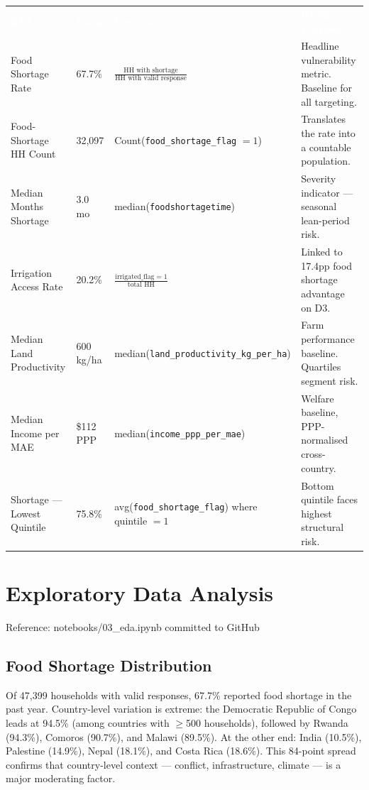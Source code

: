 \documentclass[11pt,a4paper]{article}
\newcommand{\tH}[1]{\cellcolor{rhoRed}\textcolor{white}{\textbf{#1}}}
\newcommand{\nb}[1]{\vspace{2pt}\begin{refbox}Reference: #1\end{refbox}\vspace{3pt}}
\begin{document}
{\small\setlength{\tabcolsep}{5pt}
\begin{tabularx}{\linewidth}{@{}p{3.6cm} p{1.6cm} p{4.2cm} L@{}}
  \tH{KPI} & \tH{Value} & \tH{Formula} & \tH{Business Purpose} \\
  Food Shortage Rate       & 67.7\%    & $\frac{\text{HH with shortage}}{\text{HH with valid response}}$ & Headline vulnerability metric. Baseline for all targeting. \\
  Food-Shortage HH Count   & 32,097    & Count(\texttt{food\_shortage\_flag} $= 1$) & Translates the rate into a countable population. \\
  Median Months Shortage   & 3.0 mo    & median(\texttt{foodshortagetime}) & Severity indicator — seasonal lean-period risk. \\
  Irrigation Access Rate   & 20.2\%    & $\frac{\text{irrigated\_flag} = 1}{\text{total HH}}$ & Linked to 17.4pp food shortage advantage on D3. \\
  Median Land Productivity & 600 kg/ha & median(\texttt{land\_productivity\_kg\_per\_ha}) & Farm performance baseline. Quartiles segment risk. \\
  Median Income per MAE    & \$112 PPP & {\footnotesize median(\texttt{income\_ppp\_per\_mae})} & Welfare baseline, PPP-normalised cross-country. \\
  Shortage — Lowest Quintile & 75.8\%  & avg(\texttt{food\_shortage\_flag}) where quintile $= 1$ & Bottom quintile faces highest structural risk. \\
  \bottomrule
\end{tabularx}}

\newpage

\section{Exploratory Data Analysis}

\nb{notebooks/03\_eda.ipynb committed to GitHub}

\subsection{Food Shortage Distribution}

Of 47,399 households with valid responses, 67.7\% reported food shortage in the past year. Country-level variation is extreme: the Democratic Republic of Congo leads at 94.5\% (among countries with $\geq$500 households), followed by Rwanda (94.3\%), Comoros (90.7\%), and Malawi (89.5\%). At the other end: India (10.5\%), Palestine (14.9\%), Nepal (18.1\%), and Costa Rica (18.6\%). This 84-point spread confirms that country-level context — conflict, infrastructure, climate — is a major moderating factor.
\end{document}
